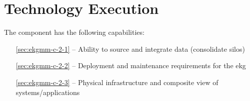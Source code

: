 \chapter{Technology Execution}\label{ch:ekgmm-c-2}

The  component has the following capabilities:

\begin{itemize}[leftmargin=.5in]
  \item [\ref{sec:ekgmm-c-2-1}]  -- Ability to source and integrate data (consolidate silos)  
  \item [\ref{sec:ekgmm-c-2-2}]  -- Deployment and maintenance requirements for the \gls{ekg}
  \item [\ref{sec:ekgmm-c-2-3}]  -- Physical infrastructure and composite view of systems/applications
\end{itemize}




